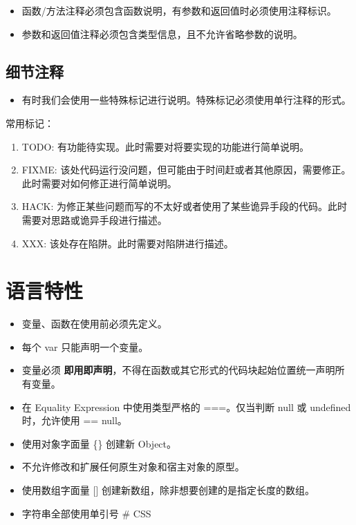 \documentclass[]{report}
\providecommand{\tightlist}{%
  \setlength{\itemsep}{0pt}\setlength{\parskip}{0pt}}
\begin{document}
\begin{itemize}
\tightlist
\item
  函数/方法注释必须包含函数说明，有参数和返回值时必须使用注释标识。
\item
  参数和返回值注释必须包含类型信息，且不允许省略参数的说明。
\end{itemize}

\hypertarget{ux7ec6ux8282ux6ce8ux91ca}{%
\subsection{细节注释}\label{ux7ec6ux8282ux6ce8ux91ca}}

\begin{itemize}
\tightlist
\item
  有时我们会使用一些特殊标记进行说明。特殊标记必须使用单行注释的形式。
\end{itemize}

常用标记：

\begin{enumerate}
\def\labelenumi{\arabic{enumi}.}
\tightlist
\item
  TODO: 有功能待实现。此时需要对将要实现的功能进行简单说明。
\item
  FIXME:
  该处代码运行没问题，但可能由于时间赶或者其他原因，需要修正。此时需要对如何修正进行简单说明。
\item
  HACK:
  为修正某些问题而写的不太好或者使用了某些诡异手段的代码。此时需要对思路或诡异手段进行描述。
\item
  XXX: 该处存在陷阱。此时需要对陷阱进行描述。
\end{enumerate}

\hypertarget{ux8bedux8a00ux7279ux6027}{%
\section{语言特性}\label{ux8bedux8a00ux7279ux6027}}

\begin{itemize}
\tightlist
\item
  变量、函数在使用前必须先定义。
\item
  每个 var 只能声明一个变量。
\item
  变量必须
  \textbf{即用即声明}，不得在函数或其它形式的代码块起始位置统一声明所有变量。
\item
  在 Equality Expression 中使用类型严格的 ===。仅当判断 null 或
  undefined 时，允许使用 == null。
\item
  使用对象字面量 \{\} 创建新 Object。
\item
  不允许修改和扩展任何原生对象和宿主对象的原型。
\item
  使用数组字面量 {[}{]} 创建新数组，除非想要创建的是指定长度的数组。
\item
  字符串全部使用单引号 \# CSS
\end{itemize}
\end{document}
